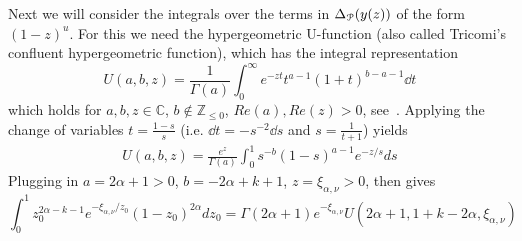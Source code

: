 Next we will consider the integrals over the terms in $\Delta_{{\mathcal P}}(y(z))$ of the form $(1-z)^u$. For this we need the hypergeometric U-function (also called Tricomi's confluent hypergeometric function), which has the integral representation 
\[
	U(a,b,z) = \frac{1}{\Gamma(a)} \int_0^\infty e^{-zt} t^{a-1} (1+t)^{b-a-1} \dd t
\] 
which holds for $a,b,z\in \mathbb{C}$, $b \not \in \mathbb{Z}_{\leq 0}$, $Re(a), Re(z) >0$, see~\cite[p.255]{erdelyi1953higher}. Applying the change of variables $t=\frac{1-s}{s}$ (i.e. $\dd t = -s^{-2} \dd s$ and $s = \frac{1}{t+1}$) yields
\begin{align*}
	U(a,b,z) = \frac{e^z}{\Gamma(a)} \int_0^1 s^{-b} (1-s)^{a-1} e^{-z/s} ds
\end{align*}
Plugging in $a=2\alpha+1 >0$, $b=-2\alpha+k+1$, $z=\xi_{\alpha,\nu}>0$, then gives
\begin{equation}\label{eq:integral_Delta_P_1_z}
	\int_0^1 z_0^{2\alpha-k-1} e^{-\xi_{\alpha,\nu}/z_0} (1-z_0)^{2\alpha} dz_0 = \Gamma(2\alpha+1)e^{-\xi_{\alpha,\nu}} U(2\alpha+1,1+k-2\alpha,\xi_{\alpha,\nu})
\end{equation}


